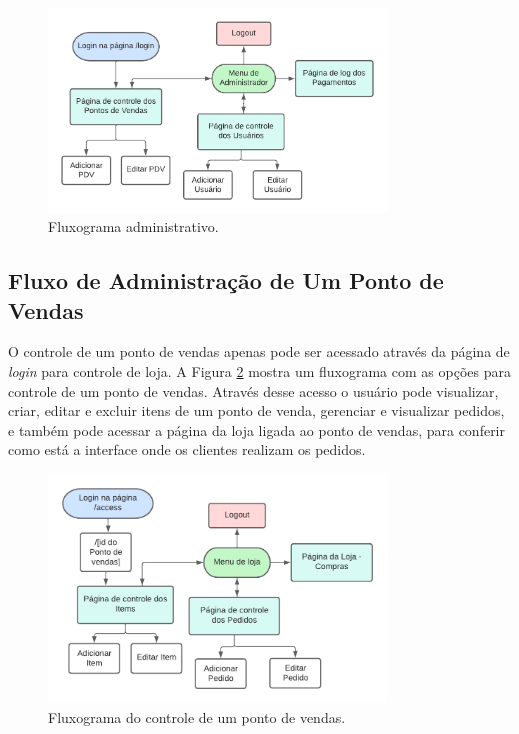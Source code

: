 \begin{figure}
	\caption{\label{fig:admin}Fluxograma administrativo.}
	\begin{center}
		\includegraphics[width=0.8\textwidth]{figuras/Diagrama administrativo.png}
	\end{center}
\end{figure}

\subsection{Fluxo de Administração de Um Ponto de Vendas}

O controle de um ponto de vendas apenas pode ser acessado através da página de \textit{login} para controle de loja. A Figura \ref{fig:pdv} mostra um fluxograma com as opções para controle de um ponto de vendas. Através desse acesso o usuário pode visualizar, criar, editar e excluir itens de um ponto de venda, gerenciar e visualizar pedidos, e também pode acessar a página da loja ligada ao ponto de vendas, para conferir como está a interface onde os clientes realizam os pedidos. 

\begin{figure}
	\caption{\label{fig:pdv}Fluxograma do controle de um ponto de vendas.}
	\begin{center}
		\includegraphics[width=0.8\textwidth]{figuras/Diagrama de controle de loja.png}
	\end{center}
\end{figure}

